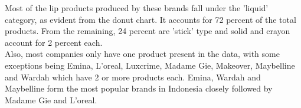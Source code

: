 \documentclass{article}
\begin{document}
\noindent Most of the lip products produced by these brands fall under the 'liquid' category, as evident from the donut chart. It accounts for 72 percent of the total products. From the remaining, 24 percent are 'stick' type and solid and crayon account for 2 percent each. \\

\noindent Also, most companies only have one product present in the data, with some exceptions being Emina, L'oreal, Luxcrime, Madame Gie, Makeover, Maybelline and Wardah which have 2 or more products each. Emina, Wardah and Maybelline form the most popular brands in Indonesia closely followed by Madame Gie and L'oreal. \\

\newpage



\newpage

\end{document}
